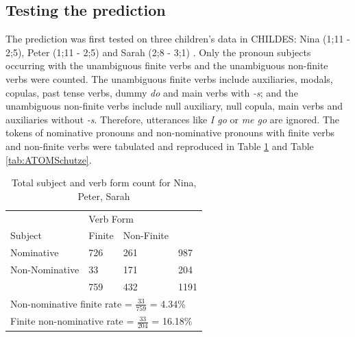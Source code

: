 \subsection{Testing the prediction}
The prediction was first tested on three children's data in CHILDES: Nina (1;11 - 2;5), Peter (1;11 - 2;5) and Sarah (2;8 - 3;1) \citep{schutze1996subject,schutze1997}. Only the pronoun subjects occurring with the unambiguous finite verbs and the unambiguous non-finite verbs were counted. The unambiguous finite verbs include auxiliaries, modals, copulas, past tense verbs, dummy \textit{do} and main verbs with \textit{-s}; and the unambiguous non-finite verbs include null auxiliary, null copula, main verbs and auxiliaries without \textit{-s}. Therefore, utterances like \textit{I go} or \textit{me go} are ignored. 
The tokens of nominative pronouns and non-nominative pronouns with finite verbs and non-finite verbs were tabulated and reproduced in Table \ref{table:schutzetotal} and Table \ref{tab:ATOMSchutze}. 
\FloatBarrier
\begin{table}[!h]
\centering
\caption{Total subject and verb form count for Nina, Peter, Sarah}
\label{table:schutzetotal}
\begin{tabular}{llll}
\toprule
 & \multicolumn{2}{l}{Verb Form} &\\ \cline{2-3} 
Subject & Finite & Non-Finite &\\ \hline
Nominative & 726  & 261  & 987 \\
Non-Nominative & 33  & 171  & 204 \\
\hline
& 759  & 432 & 1191  \\
\hline
 \multicolumn{4}{l}{Non-nominative finite rate = $\frac{33}{759}$ = 4.34\%} \\
\multicolumn{4}{l}{Finite non-nominative rate = $\frac{33}{204}$ = 16.18\%} \\
\bottomrule
\end{tabular}
\end{table}
\FloatBarrier

